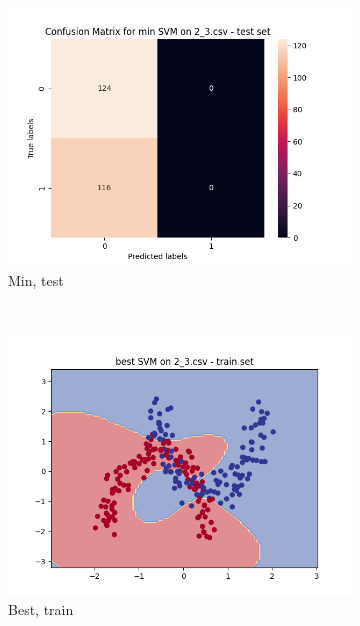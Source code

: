\documentclass[12pt]{article}
\newcommand*{\subfigwidth}{0.24\textwidth}
\begin{document}
\begin{figure}[H]
\begin{subfigure}[t]{\subfigwidth}
        \includegraphics[width=\linewidth]{img/exp_2/svm/2_3/min/test_matrix.png}
        \caption{Min, test}
    \end{subfigure} 
    \\
    \begin{subfigure}[t]{\subfigwidth}
        \includegraphics[width=\linewidth]{img/exp_2/svm/2_3/best/train_boundary.png}
        \caption{Best, train}
    \end{subfigure}
    \hfill
    \begin{subfigure}[t]{\subfigwidth}

\end{subfigure}
\end{figure}
\end{document}
